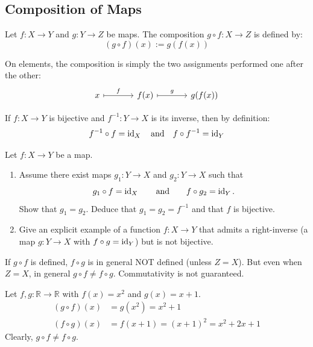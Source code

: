 \subsection{Composition of Maps}

\begin{definition}[Composition]
\label{def:composition}
Let $f: X \to Y$ and $g: Y \to Z$ be maps. The composition $g \circ f: X \to Z$ is defined by:
\[
(g \circ f)(x) := g(f(x))
\]
\end{definition}

On elements, the composition is simply the two assignments performed one after the other:
\[
\begin{tikzcd}[column sep=large]
x \arrow[r, mapsto, "f"] & f(x) \arrow[r, mapsto, "g"] & g(f(x))
\end{tikzcd}
\]

\begin{example}
If $f: X \to Y$ is bijective and $f^{-1}: Y \to X$ is its inverse, then by definition:
\[
f^{-1} \circ f = \operatorname{id}_X \quad \text{and} \quad f \circ f^{-1} = \operatorname{id}_Y
\]
\end{example}

\begin{exercise}
\label{exc:left_right_inverses}
Let $f \colon X \to Y$ be a map.
\begin{enumerate}
    \item Assume there exist maps $g_1 \colon Y \to X$ and $g_2 \colon Y \to X$ such that
    \[
    g_1 \circ f = \operatorname{id}_X \qquad \text{and} \qquad f \circ g_2 = \operatorname{id}_Y.
    \]
    Show that $g_1 = g_2$. Deduce that $g_1 = g_2 = f^{-1}$ and that $f$ is bijective.
    \item Give an explicit example of a function $f \colon X \to Y$ that admits a right-inverse (a map $g \colon Y \to X$ with $f \circ g = \operatorname{id}_Y$) but is not bijective.
\end{enumerate}
\end{exercise}

\begin{remark}
If $g \circ f$ is defined, $f \circ g$ is in general NOT defined (unless $Z=X$). But even when $Z=X$, in general $g \circ f \ne f \circ g$. Commutativity is not guaranteed.
\end{remark}

\begin{example}
Let $f, g: \mathbb{R} \to \mathbb{R}$ with $f(x) = x^2$ and $g(x) = x+1$.
\begin{align*}
(g \circ f)(x) &= g(x^2) = x^2 + 1 \\
(f \circ g)(x) &= f(x+1) = (x+1)^2 = x^2 + 2x + 1
\end{align*}
Clearly, $g \circ f \ne f \circ g$.
\end{example}

